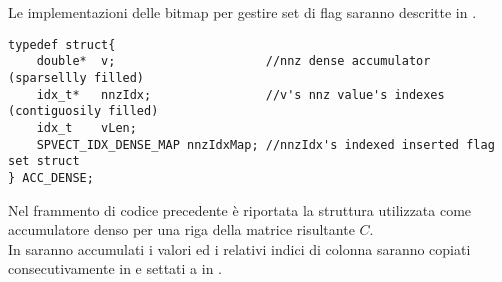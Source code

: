 Le implementazioni delle bitmap per gestire set di flag saranno descritte in .\\
\begin{lstlisting}
typedef struct{
    double*  v;                     //nnz dense accumulator		(sparsellly filled)
    idx_t*   nnzIdx;                //v's nnz value's indexes		(contiguosily filled)
    idx_t    vLen;
    SPVECT_IDX_DENSE_MAP nnzIdxMap; //nnzIdx's indexed inserted flag set struct
} ACC_DENSE;
\end{lstlisting}
Nel frammento di codice precedente è riportata la struttura utilizzata come accumulatore denso per una riga della matrice risultante $C$.\\
In  saranno accumulati i valori \nnz ed i relativi indici di colonna 
saranno copiati consecutivamente in  e settati a  in .

